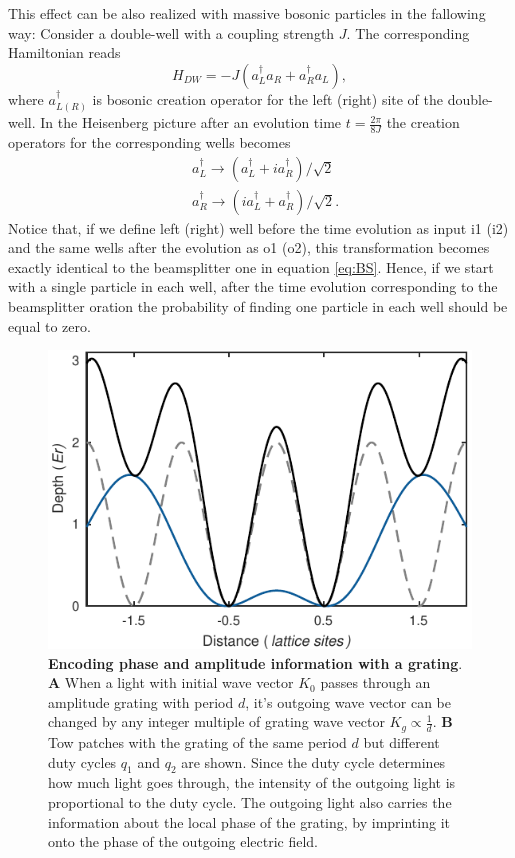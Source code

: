 This effect can be also realized with massive bosonic particles in the fallowing way: Consider a double-well with a coupling strength $J$. The corresponding Hamiltonian reads 
\begin{equation}
H_{DW} = -J(a^{\dagger}_L a_R + a^{\dagger}_R a_L),
\end{equation}
where $a^{\dagger}_{L(R)}$ is bosonic creation operator for the left (right) site of the double-well. In the Heisenberg picture after an evolution time $t= \frac{2 \pi}{8J}$ the creation operators for the corresponding wells becomes
\begin{equation}
\begin{aligned}
& a_{L}^{\dagger} \rightarrow (a_{L}^{\dagger} +ia_{R}^{\dagger} )/\sqrt{2} \\
& a_{R}^{\dagger} \rightarrow (ia_{L}^{\dagger} +a_{R}^{\dagger} )/\sqrt{2}.
\end{aligned}
\end{equation}
Notice that, if we define left (right) well before the time evolution as input i1 (i2) and the same wells after the evolution as o1 (o2), this transformation becomes exactly identical to the beamsplitter one in equation \ref{eq:BS}. Hence, if we start with a single particle in each well, after the time evolution corresponding to the beamsplitter oration the probability of finding one particle in each well should be equal to zero. 

\begin{figure}[t]
	\centering
	\includegraphics[scale=1]{figures/CBH_DW.pdf}
	\caption{{\bf Encoding phase and amplitude information with a grating}. {\bf A} When a light with initial wave vector $K_0$ passes through an amplitude grating with period $d$, it's outgoing wave vector can be changed by any integer multiple of grating wave vector $K_g\propto \frac{1}{d}$. {\bf B} Tow patches with the grating of the same period $d$ but different duty cycles $q_1$ and $q_2$ are shown. Since the duty cycle determines how much light goes through, the intensity of the outgoing light is proportional to the duty cycle. The outgoing light also carries the information about the local phase of the grating, by imprinting it onto the phase of the outgoing electric field.}
	\label{fig:CBH_DW}
\end{figure}

